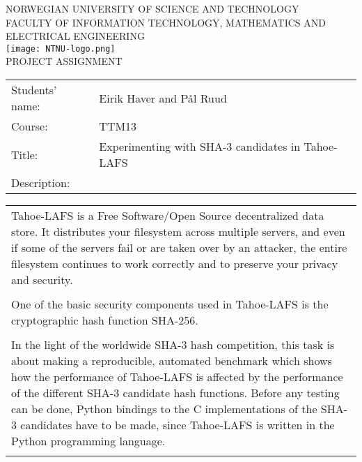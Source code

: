 %
\begin{titlepage}
\begin{center}
\textsc{NORWEGIAN UNIVERSITY OF SCIENCE AND TECHNOLOGY\\
FACULTY OF  INFORMATION TECHNOLOGY, MATHEMATICS AND ELECTRICAL ENGINEERING} \\
\vspace{0.5cm} 
\texttt{[image: NTNU-logo.png]} \\

\vspace{1.0cm}
{\Huge{PROJECT ASSIGNMENT}}
\vspace{1.0cm}

\begin{tabular}{ p{4cm} p{11cm}}

Students' name:	& Eirik Haver and Pål Ruud \\
Course: & TTM13 \\
Title: & Experimenting with SHA-3 candidates in Tahoe-LAFS \\
Description: & \\
\end{tabular}
{\small{\begin{tabular}{p{15cm}}
\vspace{0.2cm}

Tahoe-LAFS is a Free Software/Open Source decentralized data store. It
distributes your filesystem across multiple servers, and even if some of the
servers fail or are taken over by an attacker, the entire filesystem continues
to work correctly and to preserve your privacy and security.
\\\\
One of the basic security components used in Tahoe-LAFS is the cryptographic
hash function SHA-256.
\\\\
In the light of the worldwide SHA-3 hash competition, this task is about
making a reproducible, automated benchmark which shows how the performance of
Tahoe-LAFS is affected by the performance of the different SHA-3 candidate hash
functions. Before any testing can be done, Python bindings to the C
implementations of the SHA-3 candidates have to be made, since Tahoe-LAFS is
written in the Python programming language.
\\\\
\end{tabular}  }}


\end{center}
\end{titlepage}
